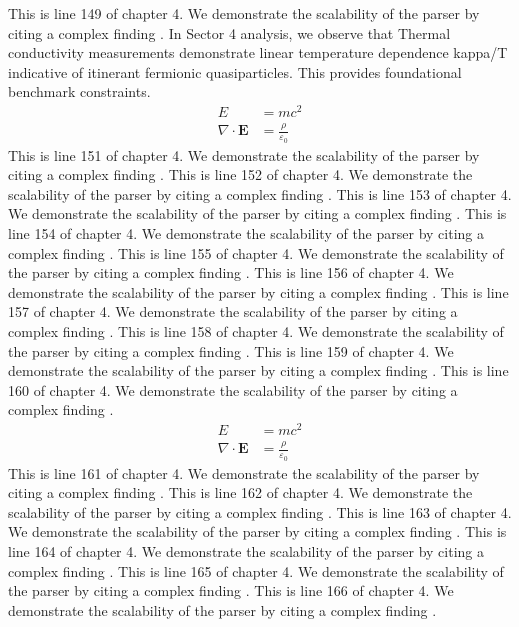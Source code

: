 This is line 149 of chapter 4. We demonstrate the scalability of the parser by citing a complex finding \cite{ref4_149}.
In Sector 4 analysis, we observe that Thermal conductivity measurements demonstrate linear temperature dependence kappa/T indicative of itinerant fermionic quasiparticles. This provides foundational benchmark constraints.
\begin{align*}
  E &= mc^2 \\
  \nabla \cdot \mathbf{E} &= \frac{\rho}{\varepsilon_0}
\end{align*}
This is line 151 of chapter 4. We demonstrate the scalability of the parser by citing a complex finding \cite{ref4_151}.
This is line 152 of chapter 4. We demonstrate the scalability of the parser by citing a complex finding \cite{ref4_152}.
This is line 153 of chapter 4. We demonstrate the scalability of the parser by citing a complex finding \cite{ref4_153}.
This is line 154 of chapter 4. We demonstrate the scalability of the parser by citing a complex finding \cite{ref4_154}.
This is line 155 of chapter 4. We demonstrate the scalability of the parser by citing a complex finding \cite{ref4_155}.
This is line 156 of chapter 4. We demonstrate the scalability of the parser by citing a complex finding \cite{ref4_156}.
This is line 157 of chapter 4. We demonstrate the scalability of the parser by citing a complex finding \cite{ref4_157}.
This is line 158 of chapter 4. We demonstrate the scalability of the parser by citing a complex finding \cite{ref4_158}.
This is line 159 of chapter 4. We demonstrate the scalability of the parser by citing a complex finding \cite{ref4_159}.
This is line 160 of chapter 4. We demonstrate the scalability of the parser by citing a complex finding \cite{ref4_160}.
\begin{align*}
  E &= mc^2 \\
  \nabla \cdot \mathbf{E} &= \frac{\rho}{\varepsilon_0}
\end{align*}
This is line 161 of chapter 4. We demonstrate the scalability of the parser by citing a complex finding \cite{ref4_161}.
This is line 162 of chapter 4. We demonstrate the scalability of the parser by citing a complex finding \cite{ref4_162}.
This is line 163 of chapter 4. We demonstrate the scalability of the parser by citing a complex finding \cite{ref4_163}.
This is line 164 of chapter 4. We demonstrate the scalability of the parser by citing a complex finding \cite{ref4_164}.
This is line 165 of chapter 4. We demonstrate the scalability of the parser by citing a complex finding \cite{ref4_165}.
This is line 166 of chapter 4. We demonstrate the scalability of the parser by citing a complex finding \cite{ref4_166}.
